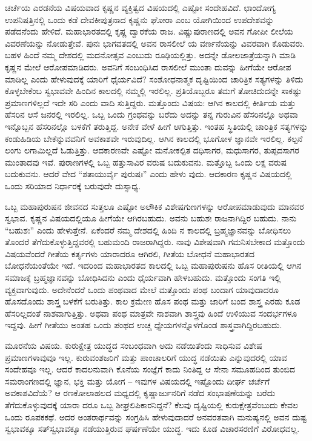 ಚರ್ಚೆಯ ಎರಡನೆಯ ವಿಷಯವಾದ ಕೃಷ್ಣನ ವ್ಯಕ್ತಿತ್ವದ ವಿಷಯದಲ್ಲಿ ಎಷ್ಟೋ ಸಂದೇಹವಿದೆ. ಛಾಂದೋಗ್ಯ ಉಪನಿಷತ್ತಿನಲ್ಲಿ ಒಂದು ಕಡೆ ದೇವಕೀಪುತ್ರನಾದ ಕೃಷ್ಣನು ಘೋರಾ ಎಂಬ ಯೋಗಿಯಿಂದ ಉಪದೇಶವನ್ನು ಪಡೆದನೆಂದು ಹೇಳಿದೆ. ಮಹಾಭಾರತದಲ್ಲಿ ಕೃಷ್ಣ ದ್ವಾರಕೆಯ ರಾಜ. ವಿಷ್ಣುಪುರಾಣದಲ್ಲಿ ಅವನ ಗೋಪೀ ಲೀಲೆಯ ವಿವರಣೆಯನ್ನು ನೋಡುತ್ತೇವೆ. ಪುನಃ ಭಾಗವತದಲ್ಲಿ ಅವನ ರಾಸಲೀಲೆ ಯ ವರ್ಣನೆಯನ್ನು ವಿವರವಾಗಿ ಕೊಡುವರು. ಬಹಳ ಹಿಂದೆ ನಮ್ಮ ದೇಶದಲ್ಲಿ ಮದನೋತ್ಸವ ಎಂಬುದು ರೂಢಿಯಲ್ಲಿತ್ತು. ಅದನ್ನೇ ಡೋಲಜಾತ್ರೆಯನ್ನಾಗಿ ಮಾಡಿ ಕೃಷ್ಣನ ಮೇಲೆ ಆರೋಪಮಾಡಿದರು. ಅವನಿಗೆ ಸಂಬಂಧಿಸಿದ ರಾಸಲೀಲೆ ಮುಂತಾ ದುವನ್ನು ಹೀಗೆಯೇ ಆರೋಪ ಮಾಡಿಲ್ಲ ಎಂದು ಹೇಳುವುದಕ್ಕೆ ಯಾರಿಗೆ ಧೈರ್ಯವಿದೆ? ಸಂಶೋಧನಾತ್ಮಕ ದೃಷ್ಟಿಯಿಂದ ಚಾರಿತ್ರಿಕ ಸತ್ಯಗಳನ್ನು ತಿಳಿದು ಕೊಳ್ಳಬೇಕೆಂಬ ಸ್ವಭಾವವೇ ಹಿಂದಿನ ಕಾಲದಲ್ಲಿ ನಮ್ಮಲ್ಲಿ ಇರಲಿಲ್ಲ. ಪ್ರತಿಯೊಬ್ಬರೂ ತಮಗೆ ತೋಚಿದುದನ್ನೇ ಸಾಕಷ್ಟು ಪ್ರಮಾಣಗಳಿಲ್ಲದೆ ಇದೇ ಸರಿ ಎಂದು ವಾದಿ ಸುತ್ತಿದ್ದರು. ಮತ್ತೊಂದು ವಿಷಯ: ಆಗಿನ ಕಾಲದಲ್ಲಿ ಕೀರ್ತಿಯ ಮತ್ತು ಹೆಸರಿನ ಆಸೆ ಜನರಲ್ಲಿ ಇರಲಿಲ್ಲ. ಒಬ್ಬ ಒಂದು ಗ್ರಂಥವನ್ನು ಬರೆದು ಅದನ್ನು ತನ್ನ ಗುರುವಿನ ಹೆಸರಿನಲ್ಲೊ ಅಥವಾ ಇನ್ನೊಬ್ಬನ ಹೆಸರಿನಲ್ಲೊ ಬಳಕೆಗೆ ತರುತ್ತಿದ್ದ. ಅನೇಕ ವೇಳೆ ಹೀಗೆ ಆಗುತ್ತಿತ್ತು. ಇಂತಹ ಸ್ಥಿತಿಯಲ್ಲಿ ಚಾರಿತ್ರಿಕ ಸತ್ಯಗಳನ್ನು ಕಂಡುಹಿಡಿಯ ಬೇಕೆನ್ನುವವನಿಗೆ ಅವಕಾಶವೇ ಇರುವುದಿಲ್ಲ. ಆಗಿನ ಕಾಲದಲ್ಲಿ ಭೂಗೋಳ ಜ್ಞಾನವೇ ಇರಲಿಲ್ಲ. ಕಲ್ಪನೆ ಲಂಗು ಲಗಾಮಿಲ್ಲದೆ ಓಡುತ್ತಿತ್ತು. ಆದಕಾರಣವೇ ಎಷ್ಟೋ ಮನೋಕಲ್ಪಿತ ದಧಿಸಾಗರ, ಮಧುಸಾಗರ, ತುಪ್ಪದಸಾಗರ ಮುಂತಾದವು ಇವೆ. ಪುರಾಣಗಳಲ್ಲಿ ಒಬ್ಬ ಹತ್ತುಸಾವಿರ ವರುಷ ಬದುಕುವನು. ಮತ್ತೊಬ್ಬ ಒಂದು ಲಕ್ಷ ವರುಷ ಬದುಕುವನು. ಆದರೆ ವೇದ “ಶತಾಯುರ್ವೈ ಪುರುಷಃ” ಎಂದು ಹೇಳು ವುದು. ಆದಕಾರಣ ಕೃಷ್ಣನ ವಿಷಯದಲ್ಲಿ ಒಂದು ಸರಿಯಾದ ನಿರ್ಧಾರಕ್ಕೆ ಬರುವುದೇ ದುಸ್ಸಾಧ್ಯ.

ಒಬ್ಬ ಮಹಾಪುರುಷನ ಜೀವನದ ಸುತ್ತಲೂ ಎಷ್ಟೋ ಅಲೌಕಿಕ ವಿಶೇಷಗುಣಗಳನ್ನು ಆರೋಪಮಾಡುವುದು ಮಾನವರ ಸ್ವಭಾವ. ಕೃಷ್ಣನ ವಿಷಯದಲ್ಲಿಯೂ ಹೀಗೆಯೇ ಆಗಿರಬಹುದು. ಅವನು ಬಹುಶಃ ರಾಜನಾಗಿದ್ದಿರ ಬಹುದು. ನಾನು “ಬಹುಶಃ” ಎಂದು ಹೇಳುತ್ತೇನೆ. ಏಕೆಂದರೆ ನಮ್ಮ ದೇಶದಲ್ಲಿ ಹಿಂದಿ ನ ಕಾಲದಲ್ಲಿ ಬ್ರಹ್ಮಜ್ಞಾನವನ್ನು ಬೋಧಿಸಲು ತೊಂದರೆ ತೆಗೆದುಕೊಳ್ಳುತ್ತಿದ್ದವರಲ್ಲಿ ಬಹುಮಂದಿ ರಾಜರಾಗಿದ್ದರು. ನಾವು ವಿಶೇಷವಾಗಿ ಗಮನಿಸಬೇಕಾದ ಮತ್ತೊಂದು ವಿಷಯವೆಂದರೆ ಗೀತೆಯ ಕರ್ತೃಗಳು ಯಾರಾದರೂ ಆಗಿರಲಿ, ಗೀತೆಯ ಬೋಧನೆ ಮಹಾಭಾರತದ ಬೋಧನೆಯಂತೆಯೇ ಇದೆ. ಇದರಿಂದ ಮಹಾಭಾರತದ ಕಾಲದಲ್ಲಿ ಒಬ್ಬ ಮಹಾಪುರುಷನು ಹೊಸ ರೀತಿಯಲ್ಲಿ ಆಗಿನ ಸಮಾಜಕ್ಕೆ ಬ್ರಹ್ಮಜ್ಞಾನವನ್ನು ಬೋಧಿಸಿದನು ಎಂದು ಧೈರ್ಯವಾಗಿ ಹೇಳಬಹುದು. ಮತ್ತೊಂದು ಸಂಗತಿ ಇಲ್ಲಿ ವ್ಯಕ್ತವಾಗುವುದು. ಅದೇನೆಂದರೆ ಒಂದು ಪಂಥವಾದ ಮೇಲೆ ಮತ್ತೊಂದು ಪಂಥ ಬಂದಾಗ ಯಾವುದಾದರೂ ಹೊಸದೊಂದು ಶಾಸ್ತ್ರ ಬಳಕೆಗೆ ಬರುತಿತ್ತು. ಕಾಲ ಕ್ರಮೇಣ ಹೊಸ ಪಂಥ ಮತ್ತು ಜಾರಿಗೆ ಬಂದ ಶಾಸ್ತ್ರ ಎರಡು ಕೂಡ ಹೆಸರಿಲ್ಲದಂತೆ ನಾಶವಾಗುತ್ತಿತ್ತು. ಅಥವಾ ಪಂಥ ಮಾತ್ರವೇ ನಾಶವಾಗಿ ಶಾಸ್ತ್ರವು ಹಿಂದೆ ಉಳಿಯುವ ಸಂದರ್ಭಗಳೂ ಇದ್ದವು. ಹೀಗೆ ಗೀತೆಯು ಅಂತಹ ಒಂದು ಪಂಥದ ಉಚ್ಚ ಧ್ಯೇಯಗಳನ್ನೊಳಗೊಂಡ ಶಾಸ್ತ್ರವಾಗಿದ್ದಿರಬಹುದು.

ಮೂರನೆಯ ವಿಷಯ. ಕುರುಕ್ಷೇತ್ರ ಯುದ್ಧದ ಸಂಬಂಧವಾಗಿ ಅದು ನಡೆಯಿತೆಂದು ಸಾಧಿಸುವ ವಿಶೇಷ ಪ್ರಮಾಣಗಳಾವುವೂ ಇಲ್ಲ. ಕುರುವಂಶಜರಿಗೆ ಮತ್ತು ಪಾಂಚಾಲರಿಗೆ ಯುದ್ಧ ನಡೆಯಿತು ಎನ್ನುವುದರಲ್ಲಿ ಯಾವ ಸಂದೇಹವೂ ಇಲ್ಲ. ಆದರೆ ಕಾದಲನುವಾಗಿ ಕೊನೆಯ ಸಂಜ್ಞೆಗೆ ಕಾದು ನಿಂತಿದ್ದ ಆ ಸೇನಾ ಸಮೂಹದಿಂದ ತುಂಬಿದ ಸಮರಾಂಗಣದಲ್ಲಿ ಜ್ಞಾನ, ಭಕ್ತಿ ಮತ್ತು ಯೋಗ – ಇವುಗಳ ವಿಷಯದಲ್ಲಿ ಇಷ್ಟೊಂದು ದೀರ್ಘ ಚರ್ಚೆಗೆ ಅವಕಾಶವಿದೆಯೆ? ಆ ರಣಕೋಲಾಹಲದ ಮಧ್ಯದಲ್ಲಿ ಕೃಷ್ಣಾರ್ಜುನರಿಗೆ ನಡೆದ ಸಂಭಾಷಣೆಯನ್ನು ಬರೆದು ತೆಗೆದುಕೊಳ್ಳುವುದಕ್ಕೆ ಯಾರಾ ದರೂ ಒಬ್ಬ ಶೀಘ್ರಲಿಪಿಕಾರನಿದ್ದನೆ? ಕೆಲವು ದೃಷ್ಟಿಯಲ್ಲಿ ಕುರುಕ್ಷೇತ್ರವೆಂಬುದು ಕೇವಲ ಒಂದು ರೂಪಕಕಥೆ. ಅದರ ಅಂತರಾರ್ಥವನ್ನು ಸಂಗ್ರಹಿಸಿ ಹೇಳುವುದಾದರೆ ಅನವರತವಾಗಿ ಮನುಷ್ಯನಲ್ಲಿ ಅವನ ದುಷ್ಟ ಸ್ವಭಾವಕ್ಕೂ ಸತ್​ ಸ್ವಭಾವಕ್ಕೂ ನಡೆಯುತ್ತಿರುವ ಘರ್ಷಣೆಯೇ ಯುದ್ಧ. ಇದು ಕೂಡ ವಿಚಾರಸರಣಿಗೆ ವಿರೋಧವಲ್ಲ.

